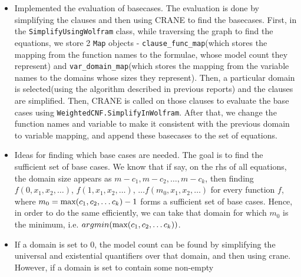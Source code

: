 \documentclass{article}
\begin{document}
\begin{itemize}
\begin{enumerate}
\begin{enumerate}
\begin{itemize}
                                \begin{lstlisting}
([y,z,...](){
    int sum{0};
    for(int x{a}; x <= b; x++)
        sum += exp;
    return sum;
})()
\end{lstlisting}
                                where y, z, ... are the free variables present
                                in \texttt{exp}.
                        \end{itemize}
                \end{enumerate}
        \end{enumerate}
  \item Implemented the evaluation of basecases. The evaluation is done by
        simplifying the clauses and then using CRANE to find the basecases.
        First, in the \texttt{SimplifyUsingWolfram} class, while traversing the
        graph to find the equations, we store 2 \texttt{Map} objects -
        \texttt{clause\_func\_map}(which stores the mapping from the function
        names to the formulae, whose model count they represent) and
        \texttt{var\_domain\_map}(which stores the mapping from the variable
        names to the domains whose sizes they represent). Then, a particular
        domain is selected(using the algorithm described in previous reports)
        and the clauses are simplified. Then, CRANE is called on those clauses
        to evaluate the base cases using \texttt{WeightedCNF.SimplifyInWolfram}.
        After that, we change the function names and variable to make it
        consistent with the previous domain to variable mapping, and append
        these basecases to the set of equations.
  \item Ideas for finding which base cases are needed. The goal is to find the
        sufficient set of base cases. We know that if say, on the rhs of all
        equations, the domain size appears as $m-c_1, m-c_2, \dots, m-c_k$, then
        finding $f(0, x_1, x_2, \dots)$, $f(1, x_1, x_2, \dots)$,
        $\dots f(m_0, x_1, x_2, \dots)$ for every function $f$, where
        $m_0 = \textnormal{max}(c_1, c_2, \dots c_k) - 1$ forms a sufficient set
        of base cases. Hence, in order to do the same efficiently, we can take
        that domain for which $m_0$ is the minimum, i.e.
        $argmin(\textnormal{max}(c_1, c_2, \dots c_k))$.
  \item If a domain is set to $0$, the model count can be found by simplifying
        the universal and existential quantifiers over that domain, and then
        using crane. However, if a domain is set to contain some non-empty

\end{itemize}
\end{document}
